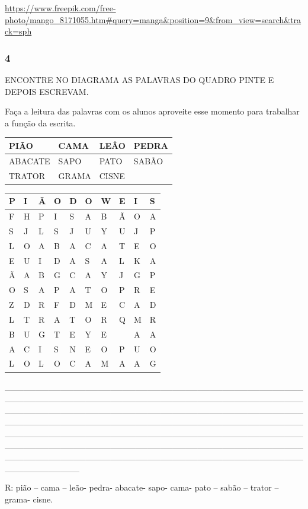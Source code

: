 \url{https://www.freepik.com/free-photo/mango_8171055.htm\#query=manga\&position=9\&from_view=search\&track=sph}

\subsubsection{4 }\label{section-18}

ENCONTRE NO DIAGRAMA AS PALAVRAS DO QUADRO PINTE E DEPOIS ESCREVAM.

Faça a leitura das palavras com os alunos aproveite esse momento para
trabalhar a função da escrita.

\begin{longtable}[]{@{}llll@{}}
\toprule
PIÃO & CAMA & LEÂO & PEDRA\tabularnewline
\midrule
\endhead
ABACATE & SAPO & PATO & SABÃO\tabularnewline
TRATOR & GRAMA & CISNE\tabularnewline
\bottomrule
\end{longtable}

\begin{longtable}[]{@{}llllllllll@{}}
\toprule
P & I & Ã & O & D & O & W & E & I & S\tabularnewline
\midrule
\endhead
F & H & P & I & S & A & B & Ã & O & A\tabularnewline
S & J & L & S & J & U & Y & U & J & P\tabularnewline
L & O & A & B & A & C & A & T & E & O\tabularnewline
E & U & I & D & A & S & A & L & K & A\tabularnewline
Ã & A & B & G & C & A & Y & J & G & P\tabularnewline
O & S & A & P & A & T & O & P & R & E\tabularnewline
Z & D & R & F & D & M & E & C & A & D\tabularnewline
L & T & R & A & T & O & R & Q & M & R\tabularnewline
B & U & G & T & E & Y & E & & A & A\tabularnewline
A & C & I & S & N & E & O & P & U & O\tabularnewline
L & O & L & O & C & A & M & A & A & G\tabularnewline
\bottomrule
\end{longtable}

\_\_\_\_\_\_\_\_\_\_\_\_\_\_\_\_\_\_\_\_\_\_\_\_\_\_\_\_\_\_\_\_\_\_\_\_\_\_\_\_\_\_\_\_\_\_\_\_\_\_\_\_\_\_\_\_\_\_\_\_\_\_\_\_\_\_\_\_\_\_\_\_\_\_\_\_\_\_\_\_\_\_\_\_\_\_\_\_\_\_\_\_\_\_\_\_\_\_\_\_\_\_\_\_\_\_\_\_\_\_\_\_\_\_\_\_\_\_\_\_\_\_\_\_\_\_\_\_\_\_\_\_\_\_\_\_\_\_\_\_\_\_\_\_\_\_\_\_\_\_\_\_\_\_\_\_\_\_\_\_\_\_\_\_\_\_\_\_\_\_\_\_\_\_\_\_\_\_\_\_\_\_\_\_\_\_\_\_\_\_\_\_\_\_\_\_\_\_\_\_\_\_\_\_\_\_\_\_\_\_\_\_\_\_\_\_\_\_\_\_\_\_\_\_\_\_\_\_\_\_\_\_\_\_\_\_\_\_\_\_\_\_\_\_\_\_\_\_\_\_\_\_\_\_\_\_\_\_\_\_\_\_\_\_\_\_\_\_\_\_\_\_\_\_\_\_\_\_\_\_\_\_\_\_\_\_\_\_\_\_\_\_\_\_\_\_\_\_\_\_\_\_\_\_\_\_\_\_\_\_\_\_\_\_\_\_\_\_\_\_\_\_\_\_\_\_\_\_\_\_\_\_\_\_\_\_\_\_\_\_\_\_\_\_\_\_\_\_

R: pião -- cama -- leão- pedra- abacate- sapo- cama- pato -- sabão --
trator -- grama- cisne.

